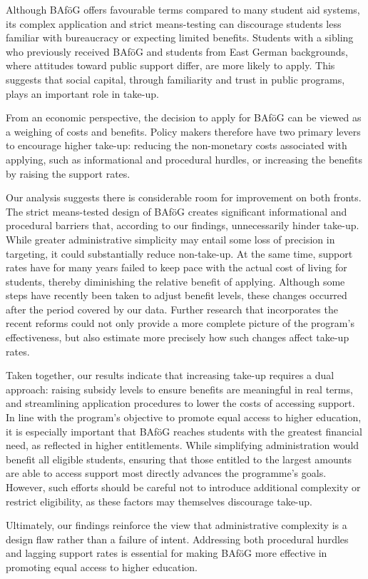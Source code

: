 Although BAföG offers favourable terms compared to many student aid systems, its complex application and strict means-testing can discourage students less familiar with bureaucracy or expecting limited benefits.
Students with a sibling who previously received BAföG and students from East German backgrounds, where attitudes toward public support differ, are more likely to apply.
This suggests that social capital, through familiarity and trust in public programs, plays an important role in take-up.

From an economic perspective, the decision to apply for BAföG can be viewed as a weighing of costs and benefits. 
Policy makers therefore have two primary levers to encourage higher take-up: reducing the non-monetary costs associated with applying, such as informational and procedural hurdles, or increasing the benefits by raising the support rates. 

Our analysis suggests there is considerable room for improvement on both fronts. 
The strict means-tested design of BAföG creates significant informational and procedural barriers that, according to our findings, unnecessarily hinder take-up.
While greater administrative simplicity may entail some loss of precision in targeting, it could substantially reduce non-take-up. 
At the same time, support rates have for many years failed to keep pace with the actual cost of living for students, thereby diminishing the relative benefit of applying. 
Although some steps have recently been taken to adjust benefit levels, these changes occurred after the period covered by our data. 
Further research that incorporates the recent reforms could not only provide a more complete picture of the program’s effectiveness, but also estimate more precisely how such changes affect take-up rates.

Taken together, our results indicate that increasing take-up requires a dual approach: raising subsidy levels to ensure benefits are meaningful in real terms, and streamlining application procedures to lower the costs of accessing support. In line with the program's objective to promote equal access to higher education, it is especially important that BAföG reaches students with the greatest financial need, as reflected in higher entitlements. While simplifying administration would benefit all eligible students, ensuring that those entitled to the largest amounts are able to access support most directly advances the programme’s goals. However, such efforts should be careful not to introduce additional complexity or restrict eligibility, as these factors may themselves discourage take-up.

Ultimately, our findings reinforce the view that administrative complexity is a design flaw rather than a failure of intent. Addressing both procedural hurdles and lagging support rates is essential for making BAföG more effective in promoting equal access to higher education.
